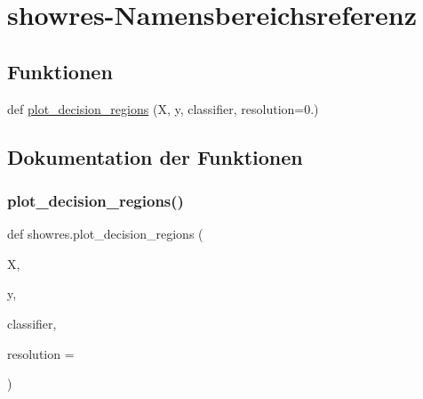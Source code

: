 \hypertarget{namespaceshowres}{}\section{showres-\/\+Namensbereichsreferenz}
\label{namespaceshowres}
\subsection*{Funktionen}
\begin{DoxyCompactItemize}
\item 
def \mbox{\hyperlink{namespaceshowres_a412893a22a9897561b0fa0104186e9a7}{plot\+\_\+decision\+\_\+regions}} (X, y, classifier, resolution=0.)
\end{DoxyCompactItemize}


\subsection{Dokumentation der Funktionen}
\mbox{\label{namespaceshowres_a412893a22a9897561b0fa0104186e9a7}} 
\subsubsection{\texorpdfstring{plot\+\_\+decision\+\_\+regions()}{plot\_decision\_regions()}}
{\footnotesize\ttfamily def showres.\+plot\+\_\+decision\+\_\+regions (\begin{DoxyParamCaption}\item[{}]{X,  }\item[{}]{y,  }\item[{}]{classifier,  }\item[{}]{resolution = {} }\end{DoxyParamCaption})}

